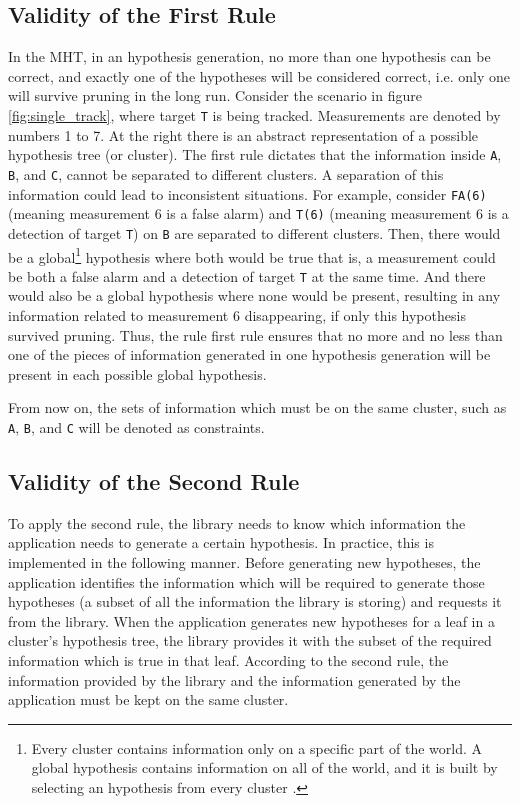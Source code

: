 \subsection{Validity of the First Rule} In the MHT, in an hypothesis generation, no more than one hypothesis can be correct, and exactly one of the hypotheses will be considered correct, i.e. only one will survive pruning in the long run. Consider the scenario in figure \ref{fig:single_track}, where target \texttt{T} is being tracked. Measurements are denoted by numbers 1 to 7. At the right there is an abstract representation of a possible hypothesis tree (or cluster). The first rule dictates that the information inside \texttt{A}, \texttt{B}, and \texttt{C}, cannot be separated to different clusters. A separation of this information could lead to inconsistent situations.
For example, consider \texttt{FA(6)} (meaning measurement 6 is a false alarm) and \texttt{T(6)} (meaning measurement 6 is a detection of target \texttt{T}) on \texttt{B} are separated to different clusters.
Then, there would be a global\footnote{
Every cluster contains information only on a specific part of the world. A global hypothesis contains information on all of the world, and it is built by selecting an hypothesis from every cluster \cite{BlackmanTutorial}.	
} hypothesis where both would be true that is, a measurement could be both a false alarm and a detection of target \texttt{T} at the same time. 
And there would also be a global hypothesis where none would be present, resulting in any information related to measurement 6 disappearing, if only this hypothesis survived pruning.
Thus, the rule first rule ensures that no more and no less than one of the pieces of information generated in one hypothesis generation will be present in each possible global hypothesis.

From now on, the sets of information which must be on the same cluster, such as \texttt{A}, \texttt{B}, and \texttt{C} will be denoted as constraints.

\subsection{Validity of the Second Rule} 
To apply the second rule, the library needs to know which information the application needs to generate a certain hypothesis. In practice, this is implemented in the following manner. Before generating new hypotheses, the application identifies the information which will be required to generate those hypotheses (a subset of all the information the library is storing) and requests it from the library. When the application generates new hypotheses for a leaf in a cluster's hypothesis tree, the library provides it with the subset of the required information which is true in that leaf. According to the second rule, the information provided by the library and the information generated by the application must be kept on the same cluster.

